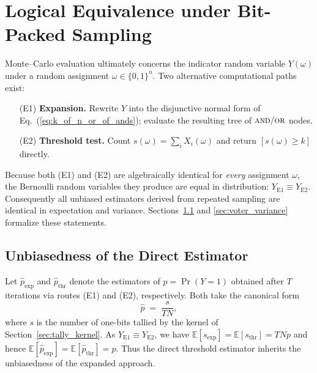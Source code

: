 \section{Logical Equivalence under Bit-Packed Sampling}
\label{sec:voter_equivalence}

Monte–Carlo evaluation ultimately concerns the indicator random variable
$Y(\omega)$ under a random assignment $\omega\in\{0,1\}^{n}$.  Two alternative
computational paths exist:
\begin{enumerate}
  \item[(E1)] \textbf{Expansion.}  Rewrite $Y$ into the disjunctive normal form
        of Eq.~(\ref{eq:k_of_n_or_of_ands}); evaluate the resulting tree of
        $\textsc{and}/\textsc{or}$ nodes.
  \item[(E2)] \textbf{Threshold test.}  Count $s(\omega)=\sum_i X_i(\omega)$
        and return $[s(\omega)\ge k]$ directly.
\end{enumerate}
Because both (E1) and (E2) are algebraically identical for \emph{every}
assignment $\omega$, the Bernoulli random variables they produce are equal in
distribution:
\(
  Y_{\mathrm{E1}}\equiv Y_{\mathrm{E2}}.
\)
Consequently all unbiased estimators derived from repeated sampling are
identical in expectation and variance.  Sections~\ref{sec:voter_unbiased} and
\ref{sec:voter_variance} formalize these statements.

\subsection{Unbiasedness of the Direct Estimator}
\label{sec:voter_unbiased}

Let $\widehat{p}_\text{exp}$ and $\widehat{p}_\text{thr}$ denote the
estimators of $p=\Pr(Y=1)$ obtained after $T$ iterations via routes (E1) and
(E2), respectively.  Both take the canonical form
\[
  \widehat{p}\;=\;\frac{s}{T N},
\]
where $s$ is the number of one-bits tallied by the kernel of
Section~\ref{sec:tally_kernel}.  As $Y_{\mathrm{E1}}\equiv Y_{\mathrm{E2}}$, we
have $\mathbb{E}[s_{\mathrm{exp}}]=\mathbb{E}[s_{\mathrm{thr}}]=T N p$ and hence
\(
  \mathbb{E}[\widehat{p}_\text{exp}] =\mathbb{E}[\widehat{p}_\text{thr}] = p.
\)
Thus the direct threshold estimator inherits the unbiasedness of the expanded
approach.

